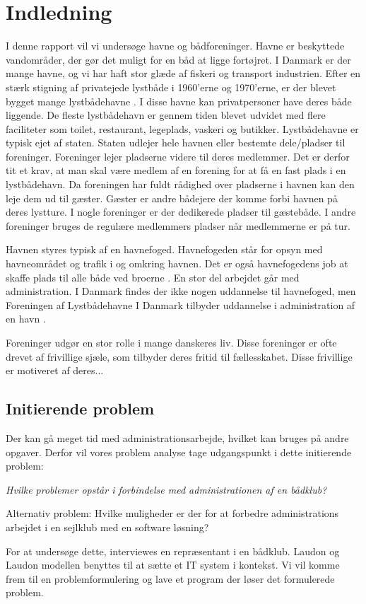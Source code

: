 \chapter{Indledning}
I denne rapport vil vi undersøge havne og bådforeninger. Havne er beskyttede vandområder, der gør det muligt for en båd at ligge fortøjret. I Danmark er der mange havne, og vi har haft stor glæde af fiskeri og transport industrien. Efter en stærk stigning af privatejede lystbåde i 1960'erne og 1970'erne, er der blevet bygget mange lystbådehavne \cite{gyldendal_redaktionen_havn_2013}. I disse havne kan privatpersoner have deres både liggende. De fleste lystbådehavn er gennem tiden blevet udvidet med flere faciliteter som toilet, restaurant, legeplads, vaskeri og butikker. Lystbådehavne er typisk ejet af staten. Staten udlejer hele havnen eller bestemte dele/pladser til foreninger. Foreninger lejer pladserne videre til deres medlemmer. Det er derfor tit et krav, at man skal være medlem af en forening for at få en fast plads i en lystbådehavn. Da foreningen har fuldt rådighed over pladserne i havnen kan den leje dem ud til gæster. Gæster er andre bådejere der komme forbi havnen på deres lystture. I nogle foreninger er der dedikerede pladser til gæstebåde. I andre foreninger bruges de regulære medlemmers pladser når medlemmerne er på tur.

Havnen styres typisk af en havnefoged. Havnefogeden står for opsyn med havneområdet og trafik i og omkring havnen. Det er også havnefogedens job at skaffe plads til alle både ved broerne \cite{undervisningsministeriet_havnefoged_2014}. En stor del arbejdet går med administration. I Danmark findes der ikke nogen uddannelse til havnefoged, men Foreningen af Lystbådehavne I Danmark tilbyder uddannelse i administration af en havn \cite{lystbadehavne_i_danmark}.

Foreninger udgør en stor rolle i mange danskeres liv. Disse foreninger er ofte drevet af frivillige sjæle, som tilbyder deres fritid til fællesskabet. Disse frivillige er motiveret af deres... 

\section{Initierende problem}

Der kan gå meget tid med administrationsarbejde, hvilket kan bruges på andre opgaver. Derfor vil vores problem analyse tage udgangspunkt i dette initierende problem:

\textit{Hvilke problemer opstår i forbindelse med administrationen af en bådklub?}

Alternativ problem:
Hvilke muligheder er der for at forbedre administrations arbejdet i en sejlklub med en software løsning?

For at undersøge dette, interviewes en repræsentant i en bådklub. Laudon og Laudon modellen benyttes til at sætte et IT system i kontekst. Vi vil komme frem til en problemformulering og lave et program der løser det formulerede problem.
